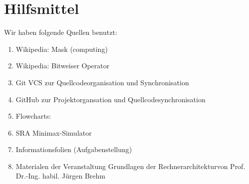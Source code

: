 \documentclass[12pt,titlepage]{article}
\begin{document}
\section{Hilfsmittel}
Wir haben folgende Quellen benutzt:
\begin{enumerate} 
\item Wikipedia: \dq Mask (computing)\dq \\ 
\item Wikipedia: \dq Bitweiser Operator\dq \\ 
\item Git VCS zur Quellcodeorganisation und Synchronisation
\item GitHub zur Projektorgansation und Quellcodesynchronisation
\item Flowcharts: 
\item SRA Minimax-Simulator
\item Informationsfolien (Aufgabenstellung)
\item Materialen der Veranstaltung \dq Grundlagen der Rechnerarchitektur\dq von Prof. Dr.-Ing. habil. Jürgen Brehm
\end{enumerate}
\end{document}
